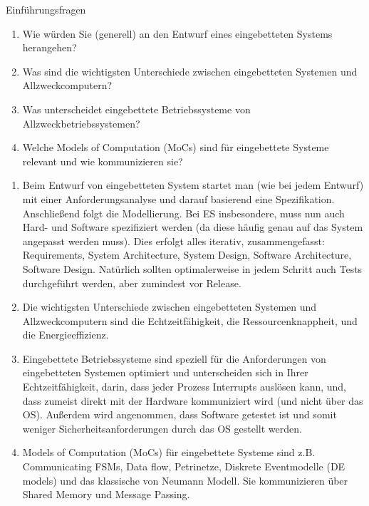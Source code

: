\documentclass{article}
\author{Leopold Lemmermann}
\begin{document}
\createtitle

\begin{exercise}{Einführungsfragen}
  \begin{enumerate}
    \item Wie würden Sie (generell) an den Entwurf eines eingebetteten Systems herangehen?
    \item Was sind die wichtigsten Unterschiede zwischen eingebetteten Systemen und Allzweckcomputern?
    \item Was unterscheidet eingebettete Betriebssysteme von Allzweckbetriebssystemen?
    \item Welche Models of Computation (MoCs) sind für eingebettete Systeme relevant und wie kommunizieren sie?
  \end{enumerate}

  \begin{solution}
    \begin{enumerate}
      \item Beim Entwurf von eingebetteten System startet man (wie bei jedem Entwurf) mit einer Anforderungsanalyse und darauf basierend eine Spezifikation. Anschließend folgt die Modellierung. Bei ES insbesondere, muss nun auch Hard- und Software spezifiziert werden (da diese häufig genau auf das System angepasst werden muss). Dies erfolgt alles iterativ, zusammengefasst: Requirements, System Architecture, System Design, Software Architecture, Software Design. Natürlich sollten optimalerweise in jedem Schritt auch Tests durchgeführt werden, aber zumindest vor Release.
      \item Die wichtigsten Unterschiede zwischen eingebetteten Systemen und Allzweckcomputern sind die Echtzeitfähigkeit, die Ressourcenknappheit, und die Energieeffizienz.
      \item Eingebettete Betriebssysteme sind speziell für die Anforderungen von eingebetteten Systemen optimiert und unterscheiden sich in Ihrer Echtzeitfähigkeit, darin, dass jeder Prozess Interrupts auslösen kann, und, dass zumeist direkt mit der Hardware kommuniziert wird (und nicht über das OS). Außerdem wird angenommen, dass Software getestet ist und somit weniger Sicherheitsanforderungen durch das OS gestellt werden.
      \item Models of Computation (MoCs) für eingebettete Systeme sind z.B. Communicating FSMs, Data flow, Petrinetze, Diskrete Eventmodelle (DE models) und das klassische von Neumann Modell. Sie kommunizieren über Shared Memory und Message Passing.
    \end{enumerate}
  \end{solution}
\end{exercise}
\end{document}
